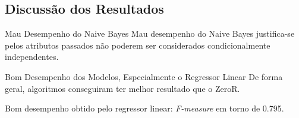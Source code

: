 \subsection{Discussão dos Resultados}
\begin{frame}{Mau Desempenho do Naive Bayes}
    Mau desempenho do Naive Bayes justifica-se pelos atributos passados
    não poderem ser considerados condicionalmente independentes. 
\end{frame}

\begin{frame}{Bom Desempenho dos Modelos, Especialmente o Regressor Linear}
    De forma geral, algoritmos conseguiram ter melhor resultado que o ZeroR.  

    \vspace{0.5cm}

    Bom desempenho obtido pelo regressor linear: \textit{F-measure} em torno de 0.795. 
\end{frame}
